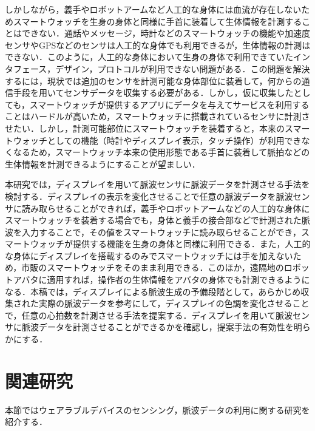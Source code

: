 \documentclass[Japanese,noauthor]{dicomopapers}
\begin{document}
しかしながら，義手やロボットアームなど人工的な身体には血流が存在しないためスマートウォッチを生身の身体と同様に手首に装着して生体情報を計測することはできない．通話やメッセージ，時計などのスマートウォッチの機能や加速度センサやGPSなどのセンサは人工的な身体でも利用できるが，生体情報の計測はできない．このように，人工的な身体において生身の身体で利用できていたインタフェース，デザイン，プロトコルが利用できない問題がある．この問題を解決するには，現状では追加のセンサを計測可能な身体部位に装着して，何からの通信手段を用いてセンサデータを収集する必要がある．しかし，仮に収集したとしても，スマートウォッチが提供するアプリにデータを与えてサービスを利用することはハードルが高いため，スマートウォッチに搭載されているセンサに計測させたい．しかし，計測可能部位にスマートウォッチを装着すると，本来のスマートウォッチとしての機能（時計やディスプレイ表示，タッチ操作）が利用できなくなるため，スマートウォッチ本来の使用形態である手首に装着して脈拍などの生体情報を計測できるようにすることが望ましい．
\par

本研究では，ディスプレイを用いて脈波センサに脈波データを計測させる手法を検討する．ディスプレイの表示を変化させることで任意の脈波データを脈波センサに読み取らせることができれば，義手やロボットアームなどの人工的な身体にスマートウォッチを装着する場合でも，身体と義手の接合部などで計測された脈波を入力することで，その値をスマートウォッチに読み取らせることができ，スマートウォッチが提供する機能を生身の身体と同様に利用できる．また，人工的な身体にディスプレイを搭載するのみでスマートウォッチには手を加えないため，市販のスマートウォッチをそのまま利用できる．このほか，遠隔地のロボットアバタに適用すれば，操作者の生体情報をアバタの身体でも計測できるようになる．本稿では，ディスプレイによる脈波生成の予備段階として，あらかじめ収集された実際の脈波データを参考にして，ディスプレイの色調を変化させることで，任意の心拍数を計測させる手法を提案する．ディスプレイを用いて脈波センサに脈波データを計測させることができるかを確認し，提案手法の有効性を明らかにする．
\par



\section{関連研究}
\label{related}
本節ではウェアラブルデバイスのセンシング，脈波データの利用に関する研究を紹介する．
\end{document}
